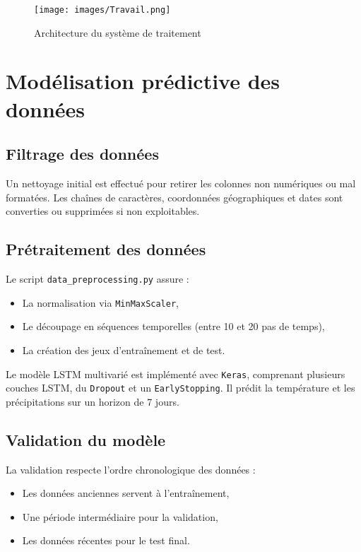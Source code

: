 \documentclass[a4paper,12pt,openany]{report}
\begin{document}
\begin{figure}[H]
	\centering
	\texttt{[image: images/Travail.png]}
	\caption{Architecture du système de traitement \label{Fig 2.6}}
\end{figure}

\section{Modélisation prédictive des données}

\subsection{Filtrage des données}

\quad Un nettoyage initial est effectué pour retirer les colonnes non numériques ou mal formatées. Les chaînes de caractères, coordonnées géographiques et dates sont converties ou supprimées si non exploitables.

\subsection{Prétraitement des données}

\quad Le script \texttt{data\_preprocessing.py} assure :
\begin{itemize}
	\item La normalisation via \texttt{MinMaxScaler},
	\item Le découpage en séquences temporelles (entre 10 et 20 pas de temps),
	\item La création des jeux d’entraînement et de test.
\end{itemize}

\quad Le modèle LSTM multivarié est implémenté avec \texttt{Keras}, comprenant plusieurs couches LSTM, du \texttt{Dropout} et un \texttt{EarlyStopping}. Il prédit la température et les précipitations sur un horizon de 7 jours.

\subsection{Validation du modèle}

\quad La validation respecte l’ordre chronologique des données :
\begin{itemize}
	\item Les données anciennes servent à l’entraînement,
	\item Une période intermédiaire pour la validation,
	\item Les données récentes pour le test final.
\end{itemize}
\end{document}
